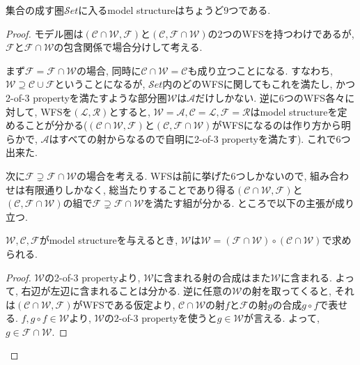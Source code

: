 \documentclass[. /main]{subfiles}
\begin{document}
\begin{momotheo}
集合の成す圏$\mathcal{S}et$に入るmodel structureはちょうど9つである. 
\end{momotheo}
\begin{proof}
モデル圏は$(\mathcal{C} \cap \mathcal{W},  \mathcal{F})$と$(\mathcal{C},  \mathcal{F} \cap \mathcal{W})$の2つのWFSを持つわけであるが, $\mathcal{F}$と$\mathcal{F} \cap \mathcal{W}$の包含関係で場合分けして考える. 

まず$\mathcal{F}=\mathcal{F} \cap \mathcal{W}$の場合, 同時に$\mathcal{C} \cap \mathcal{W}=\mathcal{C}$も成り立つことになる. すなわち, $\mathcal{W} \supseteq \mathcal{C} \cup \mathcal{F}$ということになるが, $\mathcal{S}et$内のどのWFSに関してもこれを満たし, かつ2-of-3 propertyを満たすような部分圏$\mathcal{W}$は$\mathcal{A}$だけしかない. 逆に6つのWFS各々に対して, WFSを$(\mathcal{L},  \mathcal{R})$とすると, $\mathcal{W}=\mathcal{A},  \mathcal{C}=\mathcal{L},  \mathcal{F}=\mathcal{R}$はmodel structureを定めることが分かる($(\mathcal{C} \cap \mathcal{W},  \mathcal{F})$と$(\mathcal{C},  \mathcal{F} \cap \mathcal{W})$がWFSになるのは作り方から明らかで, $\mathcal{A}$はすべての射からなるので自明に2-of-3 propertyを満たす). これで6つ出来た. 

次に$\mathcal{F} \supsetneq \mathcal{F} \cap \mathcal{W}$の場合を考える. WFSは前に挙げた6つしかないので, 組み合わせは有限通りしかなく, 総当たりすることであり得る$(\mathcal{C} \cap \mathcal{W},  \mathcal{F})$と$(\mathcal{C},  \mathcal{F} \cap \mathcal{W})$の組で$\mathcal{F} \supsetneq \mathcal{F} \cap \mathcal{W}$を満たす組が分かる. ところで以下の主張が成り立つ. 
\begin{lemm}
$\mathcal{W},  \mathcal{C},  \mathcal{F}$がmodel structureを与えるとき, $\mathcal{W}$は$\mathcal{W}=(\mathcal{F} \cap \mathcal{W}) \circ (\mathcal{C} \cap \mathcal{W})$で求められる. 
\end{lemm}
\begin{proof} $\mathcal{W}$の2-of-3 propertyより, $\mathcal{W}$に含まれる射の合成はまた$\mathcal{W}$に含まれる. よって, 右辺が左辺に含まれることは分かる. 逆に任意の$\mathcal{W}$の射を取ってくると, それは$(\mathcal{C} \cap \mathcal{W},  \mathcal{F})$がWFSである仮定より, $\mathcal{C} \cap \mathcal{W}$の射$f$と$\mathcal{F}$の射$g$の合成$g \circ f$で表せる. $f,  g \circ f \in \mathcal{W}$より, $\mathcal{W}$の2-of-3 propertyを使うと$g \in \mathcal{W}$が言える. よって, $g \in \mathcal{F} \cap \mathcal{W}$.
\end{proof}


\end{proof}
\end{document}
